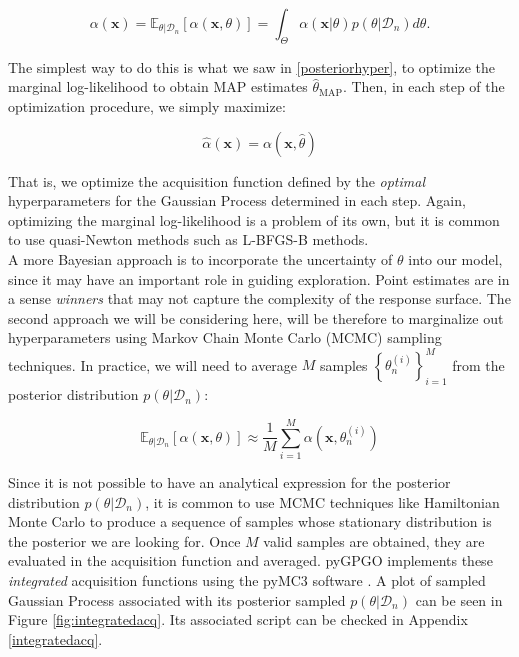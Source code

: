 \documentclass[10pt,a4paper,twoside]{book}
\begin{document}
\begin{equation}
\alpha(\boldsymbol{x}) = \mathbb{E}_{\theta|\mathcal{D}_n}\left[ \alpha(\boldsymbol{x}, \theta) \right] = \int_{\Theta} \alpha(\boldsymbol{x}|\theta)p(\theta|\mathcal{D}_n)d\theta.
\end{equation}

The simplest way to do this is what we saw in \ref{posteriorhyper}, to optimize the marginal log-likelihood to obtain MAP estimates $\hat{\theta}_{\mathrm{MAP}}$. Then, in each step of the optimization procedure, we simply maximize:

\begin{equation}
\hat{\alpha}(\boldsymbol{x}) = \alpha(\boldsymbol{x}, \hat{\theta})
\end{equation}

That is, we optimize the acquisition function defined by the \textit{optimal} hyperparameters for the Gaussian Process determined in each step. Again, optimizing the marginal log-likelihood is a problem of its own, but it is common to use quasi-Newton methods such as L-BFGS-B methods.\\

A more Bayesian approach is to incorporate the uncertainty of $\theta$ into our model, since it may have an important role in guiding exploration. Point estimates are in a sense \textit{winners} that may not capture the complexity of the response surface. The second approach we will be considering here, will be therefore to marginalize out hyperparameters using Markov Chain Monte Carlo (MCMC) sampling techniques. In practice, we will need to average $M$ samples $\left\lbrace\theta_n^{(i)}\right\rbrace ^{M}_{i=1}$ from the posterior distribution $p(\theta|\mathcal{D}_n)$:

\begin{equation}
\mathbb{E}_{\theta|\mathcal{D}_n}\left[ \alpha(\boldsymbol{x},\theta )\right] \approx \dfrac{1}{M} \sum_{i=1}^M \alpha(\boldsymbol{x},\theta_n^{(i)})
\end{equation}

Since it is not possible to have an analytical expression for the posterior distribution $p(\theta|\mathcal{D}_n)$, it is common to use MCMC techniques like Hamiltonian Monte Carlo \cite{Neal2011} to produce a sequence of samples whose stationary distribution is the posterior we are looking for. Once $M$ valid samples are obtained, they are evaluated in the acquisition function and averaged. pyGPGO implements these \textit{integrated} acquisition functions using the pyMC3 software \cite{Coyle2015}. A plot of sampled Gaussian Process associated with its posterior sampled $p(\theta|\mathcal{D}_n)$ can be seen in Figure  \ref{fig:integratedacq}. Its associated script can be checked in Appendix \ref{integratedacq}.
\end{document}
